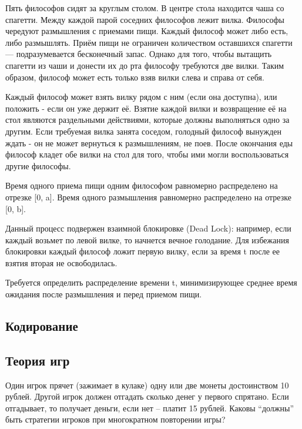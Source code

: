\begin{problem}
Пять философов сидят за круглым столом. В центре стола находится чаша со
спагетти. Между каждой парой соседних философов лежит вилка. Философы чередуют размышления с приемами пищи. Каждый философ может либо есть, либо размышлять. Приём пищи не ограничен
количеством оставшихся спагетти — подразумевается бесконечный запас. Однако
для того, чтобы вытащить спагетти из чаши и донести их до рта философу требуются
две вилки. Таким образом, философ может есть только взяв вилки слева и справа от
себя. 

Каждый философ может взять вилку рядом с ним (если она доступна), или положить
- если он уже держит её. Взятие каждой вилки и возвращение её на стол являются
раздельными действиями, которые должны выполняться одно за другим. Если
требуемая вилка занята соседом, голодный философ вынужден ждать - он не
может вернуться к размышлениям, не поев. После окончания еды философ кладет
обе вилки на стол для того, чтобы ими могли воспользоваться другие философы.

Время одного приема пищи одним философом равномерно распределено на отрезке [0, a]. 
Время одного размышления равномерно распределено на отрезке [0, b].

Данный процесс подвержен взаимной блокировке (Dead Lock): например, если каждый возьмет по левой вилке, то начнется вечное голодание. Для избежания блокировки каждый философ ложит первую вилку, если за время t после ее взятия вторая не освободилась.

Требуется определить распределение времени t, минимизирующее среднее время ожидания после размышления и перед приемом пищи.

\end{problem}



\subsection{Кодирование}
\subsection{Теория игр}
\begin{problem}
Один игрок прячет (зажимает в кулаке) одну или две монеты достоинством 10 рублей. Другой игрок должен отгадать сколько денег у первого спрятано. Если отгадывает, то получает деньги, если нет -- платит 15 рублей. Каковы ``должны'' быть стратегии игроков при многократном повторении игры?

\end{problem}